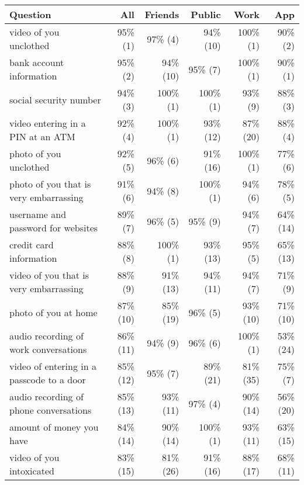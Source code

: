 

\begin{table*}[t]
\begin{center}
\footnotesize
\begin{tabular}{| l | r | r | r | r | r |}
\hline
Question & All & Friends & Public & Work& App \\
\hline
video of you unclothed & 95\% (1) & 97\% (4) & 94\% (10) & 100\% (1) & 90\% (2) \\ 
bank account information & 95\% (2) & 94\% (10) & 95\% (7) & 100\% (1) & 90\% (1) \\ 
social security number & 94\% (3) & 100\% (1) & 100\% (1) & 93\% (9) & 88\% (3) \\ 
video entering in a PIN at an ATM & 92\% (4) & 100\% (1) & 93\% (12) & 87\% (20) & 88\% (4) \\ 
photo of you unclothed & 92\% (5) & 96\% (6) & 91\% (16) & 100\% (1) & 77\% (6) \\ 
photo of you that is very embarrassing & 91\% (6) & 94\% (8) & 100\% (1) & 94\% (6) & 78\% (5) \\ 
username and password for websites & 89\% (7) & 96\% (5) & 95\% (9) & 94\% (7) & 64\% (14) \\ 
credit card information & 88\% (8) & 100\% (1) & 93\% (13) & 95\% (5) & 65\% (13) \\ 
video of you that is very embarrassing & 88\% (9) & 91\% (13) & 94\% (11) & 94\% (7) & 71\% (9) \\ 
photo of you at home & 87\% (10) & 85\% (19) & 96\% (5) & 93\% (10) & 71\% (10) \\ 
audio recording of work conversations & 86\% (11) & 94\% (9) & 96\% (6) & 100\% (1) & 53\% (24) \\ 
video of entering in a passcode to a door & 85\% (12) & 95\% (7) & 89\% (21) & 81\% (35) & 75\% (7) \\ 
audio recording of phone conversations & 85\% (13) & 93\% (11) & 97\% (4) & 90\% (14) & 56\% (20) \\ 
amount of money you have & 84\% (14) & 90\% (14) & 100\% (1) & 93\% (11) & 63\% (15) \\ 
video of you intoxicated & 83\% (15) & 81\% (26) & 91\% (16) & 88\% (17) & 68\% (11) \\ 

\end{tabular}
\end{center}
\end{table*}
